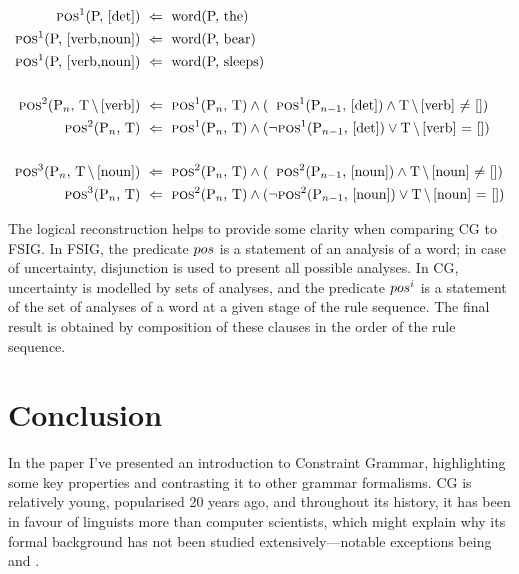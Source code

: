 \begin{align*}
\text{{\sc pos}$^1$(P, [det])} \  &\Leftarrow \  \text{word(P, the)} \\
\text{{\sc pos}$^1$(P, [verb,noun])} \ &\Leftarrow \ \text{word(P, bear)} \\
\text{{\sc pos}$^1$(P, [verb,noun])} \ &\Leftarrow \ \text{word(P, sleeps)} \\ \\
\text{{\sc pos}$^2$(P$_n$, T$\,\setminus\,$[verb])} \ &\Leftarrow \ \text{{\sc pos}$^1$(P$_n$, T)}
 \wedge (\;\; \text{{\sc pos}$^1$(P$_{n-1}$, [det])}  \wedge  \text{T$\,\setminus\,$[verb] $\neq$ []}) \\
\text{{\sc pos}$^2$(P$_n$, T)} \ &\Leftarrow \  \text{{\sc pos}$^1$(P$_n$, T)} \wedge
(\neg \text{{\sc pos}$^1$(P$_{n-1}$, [det])} \vee \text{T$\,\setminus\,$[verb]
  $=$ []}) \\ \\
\text{{\sc pos}$^3$(P$_n$, T$\,\setminus\,$[noun])} \ &\Leftarrow \ \text{{\sc pos}$^2$(P$_n$, T)}
 \wedge (\;\; \text{{\sc pos}$^2$(P$_{n-1}$, [noun])}  \wedge  \text{T$\,\setminus\,$[noun] $\neq$ []}) \\
\text{{\sc pos}$^3$(P$_n$, T)} \ &\Leftarrow \  \text{{\sc pos}$^2$(P$_n$, T)} \wedge
(\neg \text{{\sc pos}$^2$(P$_{n-1}$, [noun])} \vee \text{T$\,\setminus\,$[noun]
  $=$ []})
\end{align*}

The logical reconstruction helps to provide some clarity when comparing CG
to FSIG. In FSIG, the predicate ${\sc pos}$ is a statement of an analysis of a
word; in case of uncertainty, disjunction is used to present all possible analyses. In CG, uncertainty is modelled by sets of analyses,
and the predicate ${\sc pos}^i$ is a statement of the
set of analyses of a word at a given stage of the rule sequence. The
final result is obtained by composition of these clauses in the order of
the rule sequence.



\section*{Conclusion}

In the paper I've presented an introduction to Constraint Grammar,
highlighting some key properties and contrasting it to other grammar
formalisms.
CG is relatively young, popularised 20 years ago, and throughout its
history, it has been in favour of linguists more than computer
scientists, which might explain why its formal background has not been
studied extensively---notable exceptions being \cite{lager98} and \cite{lager_nivre01}.
 
